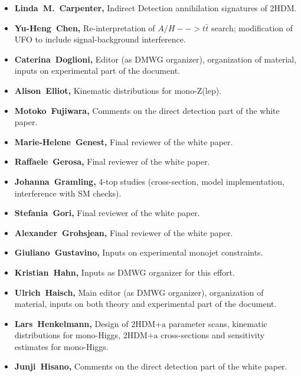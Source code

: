 \documentclass[a4paper, 11pt,notoc]{article}
\newcommand{\hdma}{\ensuremath{\textrm{2HDM+a}}\xspace}
\begin{document}
\begin{itemize}
\item \textbf{Linda~M.~Carpenter,} Indirect Detection annihilation signatures of 2HDM.

\item \textbf{Yu-Heng~Chen,} Re-interpretation of $A/H-->t\bar{t}$ search; modification of UFO to include signal-background interference.

\item \textbf{Caterina~Doglioni,} Editor (as DMWG organizer), organization of material, inputs on experimental part of the document. 

\item \textbf{Alison~Elliot,} Kinematic distributions for mono-Z(lep). 

\item \textbf{Motoko~Fujiwara,} Comments on the direct detection part of the white paper. 

\item \textbf{Marie-Helene~Genest,} Final reviewer of the white paper. 

\item \textbf{Raffaele~Gerosa,} Final reviewer of the white paper. 

\item \textbf{Johanna~Gramling,} 4-top studies (cross-section, model implementation, interference with SM checks).

\item \textbf{Stefania~Gori,} Final reviewer of the white paper. 

\item \textbf{Alexander~Grohsjean,} Final reviewer of the white paper. 

\item \textbf{Giuliano~Gustavino,} Inputs on experimental monojet constraints. 

\item \textbf{Kristian~Hahn,} Inputs as DMWG organizer for this effort. 

\item \textbf{Ulrich~Haisch,} Main editor (as DMWG organizer), organization of material, inputs on both theory and experimental part of the document. 
 
\item \textbf{Lars~Henkelmann,} Design of \hdma parameter scans,  kinematic distributions for mono-Higgs, \hdma cross-sections and sensitivity estimates for mono-Higgs.

\item \textbf{Junji~Hisano,} Comments on the direct detection part of the white paper. 


\end{itemize}
\end{document}
